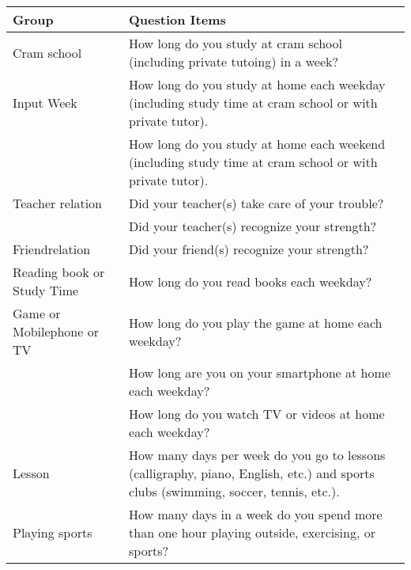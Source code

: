 \begin{tabular}{lp{13cm}}
\hline \hline 
Group & Question Items \\
\hline 
Cram school & How long do you study at cram school (including private tutoing) in a week? \\
Input Week & How long do you study at home each weekday (including study time at cram school or with private tutor). \\
 & How long do you study at home each weekend (including study time at cram school or with private tutor). \\
Teacher relation & Did your teacher(s) take care of your trouble? \\
 & Did your teacher(s) recognize your strength? \\
Friendrelation & Did your friend(s) recognize your strength? \\
Reading book or Study Time & How long do you read books each weekday? \\
Game or Mobilephone or TV & How long do you play the game at home each weekday? \\
 & How long are you on your smartphone at home each weekday? \\
 & How long do you watch TV or videos at home each weekday? \\
Lesson & How many days per week do you go to lessons (calligraphy, piano, English, etc.) and sports clubs (swimming, soccer, tennis, etc.). \\
Playing sports & How many days in a week do you spend more than one hour playing outside, exercising, or sports? \\
\hline \hline
\end{tabular}